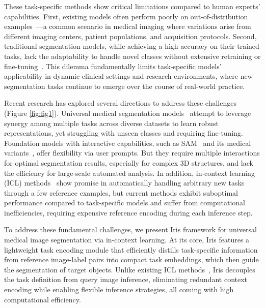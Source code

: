 These task-specific methods show critical limitations compared to human experts' capabilities. First, existing models often perform poorly on out-of-distribution examples~\cite{zhou2022domain}—a common scenario in medical imaging where variations arise from different imaging centers, patient populations, and acquisition protocols. Second, traditional segmentation models, while achieving a high accuracy on their trained tasks, lack the adaptability to handle novel classes without extensive retraining or fine-tuning~\cite{zhang2023continual}. This dilemma fundamentally limits task-specific models' applicability in dynamic clinical settings and research environments, where new segmentation tasks continue to emerge over the course of real-world practice.



Recent research has explored several directions to address these challenges (Figure \ref{fig:fig1}). Universal medical segmentation models~\cite{zhang2021dodnet,liu2023clip,ye2023uniseg,ulrich2023multitalent} attempt to leverage synergy among multiple tasks across diverse datasets to learn robust representations, yet struggling with unseen classes and requiring fine-tuning. Foundation models with interactive capabilities, such as SAM~\cite{kirillov2023segment} and its medical variants~\cite{zhang2024data,ma2024segment,cheng2023sam,wang2024sam}, offer flexibility via user prompts. But they require multiple interactions for optimal segmentation results, especially for complex 3D structures, and lack the efficiency for large-scale automated analysis. In addition, in-context learning (ICL) methods~\cite{butoi2023universeg,rakic2024tyche} show promise in automatically handling arbitrary new tasks through a few reference examples, but current methods exhibit suboptimal performance compared to task-specific models and suffer from computational inefficiencies, requiring expensive reference encoding during each inference step.






To address these fundamental challenges, we present Iris framework for universal medical image segmentation via in-context learning. At its core, Iris features a lightweight task encoding module that efficiently distills task-specific information from reference image-label pairs into compact task embeddings, which then guide the segmentation of target objects. Unlike existing ICL methods~\cite{butoi2023universeg,rakic2024tyche}, Iris decouples the task definition from query image inference, eliminating redundant context encoding while enabling flexible inference strategies, all coming with high computational efficiency. 

